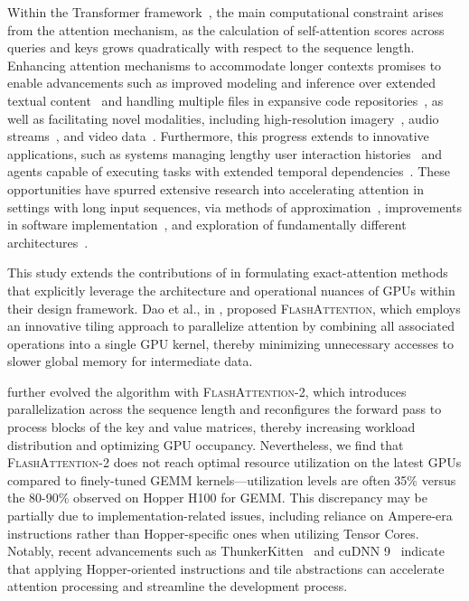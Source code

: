 Within the Transformer framework~\citep{vaswani2017attention}, the main computational constraint arises from the attention mechanism, as the calculation of self-attention scores across queries and keys grows quadratically with respect to the sequence length. Enhancing attention mechanisms to accommodate longer contexts promises to enable advancements such as improved modeling and inference over extended textual content~\citep{guo2021longt5,shaham2022scrolls,peng2023yarn} and handling multiple files in expansive code repositories~\citep{roziere2023code, li2023starcoder}, as well as facilitating novel modalities, including high-resolution imagery~\citep{chen2022scaling}, audio streams~\citep{gulati2020conformer}, and video data~\citep{ho2022video}. Furthermore, this progress extends to innovative applications, such as systems managing lengthy user interaction histories~\citep{sun2019bert4rec} and agents capable of executing tasks with extended temporal dependencies~\citep{yao2022react}. These opportunities have spurred extensive research into accelerating attention in settings with long input sequences, via methods of approximation~\citep{katharopoulos2020transformers,choromanski2020rethinking, tay2020efficient}, improvements in software implementation~\citep{rabe2021self,dao2022flashattention,kwon2023efficient}, and exploration of fundamentally different architectures~\citep{peng2023rwkv,sun2023retentive,gu2023mamba}.

This study extends the contributions of \citet{dao2022flashattention} in formulating exact-attention methods that explicitly leverage the architecture and operational nuances of GPUs within their design framework. Dao et al., in \citep{dao2022flashattention}, proposed \textsc{FlashAttention}, which employs an innovative tiling approach to parallelize attention by combining all associated operations into a single GPU kernel, thereby minimizing unnecessary accesses to slower global memory for intermediate data.

\citet{dao2023flashattention2} further evolved the algorithm with \textsc{FlashAttention-2}, which introduces parallelization across the sequence length and reconfigures the forward pass to process blocks of the key and value matrices, thereby increasing workload distribution and optimizing GPU occupancy. Nevertheless, we find that \textsc{FlashAttention-2} does not reach optimal resource utilization on the latest GPUs compared to finely-tuned GEMM kernels—utilization levels are often 35\% versus the 80-90\% observed on Hopper H100 for GEMM. This discrepancy may be partially due to implementation-related issues, including reliance on Ampere-era instructions rather than Hopper-specific ones when utilizing Tensor Cores. Notably, recent advancements such as ThunkerKitten~\citep{spector2024thunder} and cuDNN 9~\citep{cudnn9} indicate that applying Hopper-oriented instructions and tile abstractions can accelerate attention processing and streamline the development process.

